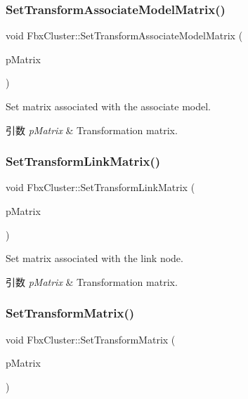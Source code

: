 \subsubsection{\texorpdfstring{Set\+Transform\+Associate\+Model\+Matrix()}{SetTransformAssociateModelMatrix()}}
{\footnotesize\ttfamily void Fbx\+Cluster\+::\+Set\+Transform\+Associate\+Model\+Matrix (\begin{DoxyParamCaption}\item[{const \hyperlink{class_fbx_a_matrix}{Fbx\+A\+Matrix} \&}]{p\+Matrix }\end{DoxyParamCaption})}

Set matrix associated with the associate model. 
\begin{DoxyParams}{引数}
{\em p\+Matrix} & Transformation matrix. \\
\hline
\end{DoxyParams}
\mbox{\label{class_fbx_cluster_aa7d541a302bab3e32403968ba4ebc19c}} 
\subsubsection{\texorpdfstring{Set\+Transform\+Link\+Matrix()}{SetTransformLinkMatrix()}}
{\footnotesize\ttfamily void Fbx\+Cluster\+::\+Set\+Transform\+Link\+Matrix (\begin{DoxyParamCaption}\item[{const \hyperlink{class_fbx_a_matrix}{Fbx\+A\+Matrix} \&}]{p\+Matrix }\end{DoxyParamCaption})}

Set matrix associated with the link node. 
\begin{DoxyParams}{引数}
{\em p\+Matrix} & Transformation matrix. \\
\hline
\end{DoxyParams}
\mbox{\label{class_fbx_cluster_a93ec68575bffb98c18caac76341b0323}} 
\subsubsection{\texorpdfstring{Set\+Transform\+Matrix()}{SetTransformMatrix()}}
{\footnotesize\ttfamily void Fbx\+Cluster\+::\+Set\+Transform\+Matrix (\begin{DoxyParamCaption}\item[{const \hyperlink{class_fbx_a_matrix}{Fbx\+A\+Matrix} \&}]{p\+Matrix }\end{DoxyParamCaption})}


